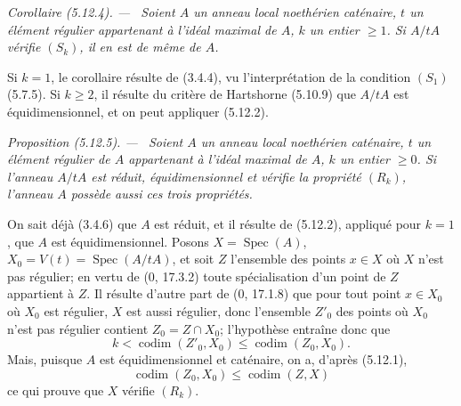 \documentclass[10pt,oneside]{book}
\newenvironment{proposition}[1][]{%
  \par\medskip\noindent\itshape Proposition (#1). ---\ }{\par}
\newenvironment{corollary}[1][]{%
  \par\medskip\noindent\itshape Corollaire (#1). ---\ }{\par}
\begin{document}
\begin{corollary}[5.12.4]
\label{IV.2.s5.12.4-fr}
Soient $A$ un anneau local noethérien caténaire, $t$ un élément régulier
appartenant à l'idéal maximal de $A$, $k$ un entier $\geq1$. Si $A/tA$
vérifie $(S_k)$, il en est de même de $A$.
\end{corollary}

Si $k=1$, le corollaire résulte de (3.4.4), vu l'interprétation de la condition
$(S_1)$ (5.7.5). Si $k\geq2$, il résulte du critère de Hartshorne (5.10.9) que
$A/tA$ est équidimensionnel, et on peut appliquer (5.12.2).

\begin{proposition}[5.12.5]
\label{IV.2.s5.12.5-fr}
Soient $A$ un anneau local noethérien caténaire, $t$ un élément régulier de $A$
appartenant à l'idéal maximal de $A$, $k$ un entier $\geq0$. Si l'anneau
$A/tA$ est réduit, équidimensionnel et vérifie la propriété $(R_k)$, l'anneau
$A$ possède aussi ces trois propriétés.
\end{proposition}

On sait déjà (3.4.6) que $A$ est réduit, et il résulte de (5.12.2), appliqué
pour $k=1$, que $A$ est équidimensionnel. Posons
$X=\operatorname{Spec}(A)$, $X_0=V(t)=\operatorname{Spec}(A/tA)$, et soit $Z$
l'ensemble des points $x\in X$ où $X$ n'est pas régulier; en vertu de (0,
17.3.2) toute spécialisation d'un point de $Z$ appartient à $Z$. Il résulte
d'autre part de (0, 17.1.8) que pour tout point $x\in X_0$ où $X_0$ est
régulier, $X$ est aussi régulier, donc l'ensemble $Z'_0$ des points où $X_0$
n'est pas régulier contient $Z_0=Z\cap X_0$; l'hypothèse entraîne donc que
\[
k<\operatorname{codim}(Z'_0,X_0)\leq\operatorname{codim}(Z_0,X_0).
\]
Mais, puisque $A$ est équidimensionnel et caténaire, on a, d'après (5.12.1),
\[
\operatorname{codim}(Z_0,X_0)\leq\operatorname{codim}(Z,X)
\]
ce qui prouve que $X$ vérifie $(R_k)$.
\end{document}
